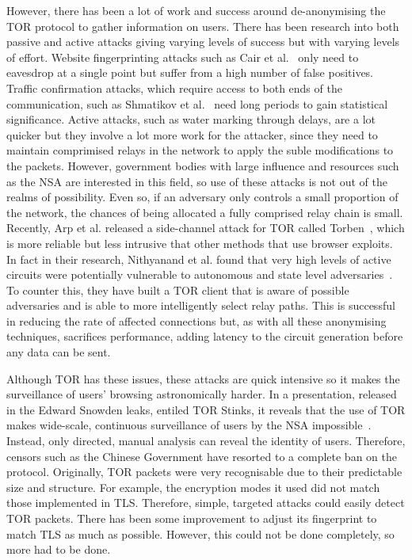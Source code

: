 \documentclass[ %
                    author={Samuel Russell},
                supervisor={Prof. Bogdan Warinschi},
                    degree={MEng},
                     title={Innocuous Ciphertexts},
                  subtitle={The DE-CENSOR Scheme},
                      type={research},
                      year={2018} ]{dissertation}
\begin{document}
However, there has been a lot of work and success around de-anonymising the TOR protocol to gather information on users. There has been research into both passive and active attacks giving varying levels of success but with varying levels of effort. Website fingerprinting attacks such as Cair et al.~\cite{webfinger} only need to eavesdrop at a single point but suffer from a high number of false positives. Traffic confirmation attacks, which require access to both ends of the communication, such as Shmatikov et al.~\cite{conf} need long periods to gain statistical significance. Active attacks, such as water marking through delays, are a lot quicker but they involve a lot more work for the attacker, since they need to maintain comprimised relays in the network to apply the suble modifications to the packets. However, government bodies with large influence and resources such as the NSA are interested in this field, so use of these attacks is not out of the realms of possibility. Even so, if an adversary only controls a small proportion of the network, the chances of being allocated a fully comprised relay chain is small. Recently, Arp et al. released a side-channel attack for TOR called Torben~\cite{torben}, which is more reliable but less intrusive that other methods that use browser exploits. In fact in their research, Nithyanand et al. found that very high levels of active circuits were potentially vulnerable to autonomous and state level adversaries~\cite{AS}. To counter this, they have built a TOR client that is aware of possible adversaries and is able to more intelligently select relay paths. This is successful in reducing the rate of affected connections but, as with all these anonymising techniques, sacrifices performance, adding latency to the circuit generation before any data can be sent.

Although TOR has these issues, these attacks are quick intensive so it makes the surveillance of users' browsing astronomically harder.
In a presentation, released in the Edward Snowden leaks, entiled TOR Stinks, it reveals that the use of TOR makes wide-scale, continuous surveillance of users by the NSA impossible~\cite{tor_stinks}.
Instead, only directed, manual analysis can reveal the identity of users.
Therefore, censors such as the Chinese Government have resorted to a complete ban on the protocol.
Originally, TOR packets were very recognisable due to their predictable size and structure.
For example, the encryption modes it used did not match those implemented in TLS.
Therefore, simple, targeted attacks could easily detect TOR packets.
There has been some improvement to adjust its fingerprint to match TLS as much as possible. However, this could not be done completely, so more had to be done.
\end{document}
